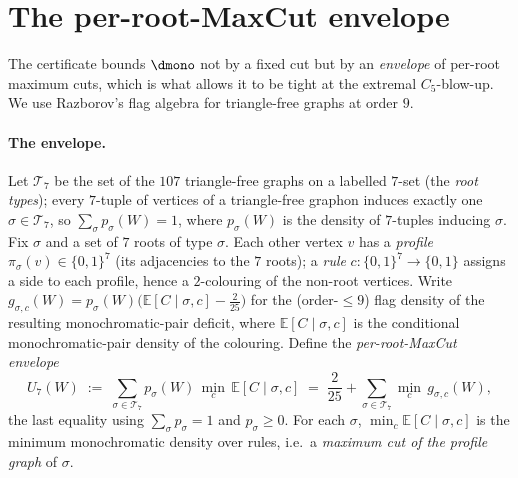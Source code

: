 
\section{The per-root-MaxCut envelope}\label{sec:cert}

The certificate bounds $\dmono$ not by a fixed cut but by an \emph{envelope} of
per-root maximum cuts, which is what allows it to be tight at the extremal
$C_5$-blow-up. We use Razborov's flag algebra for triangle-free graphs
\cite{Raz07,BCL21} at order $9$.

\paragraph{The envelope.} Let $\mathcal{T}_7$ be the set of the $107$ triangle-free
graphs on a labelled $7$-set (the \emph{root types}); every $7$-tuple of vertices
of a triangle-free graphon induces exactly one $\sigma\in\mathcal{T}_7$, so
$\sum_{\sigma}p_\sigma(W)=1$, where $p_\sigma(W)$ is the density of $7$-tuples
inducing $\sigma$. Fix $\sigma$ and a set of $7$ roots of type $\sigma$. Each other
vertex $v$ has a \emph{profile} $\pi_\sigma(v)\in\{0,1\}^7$ (its adjacencies to the
$7$ roots); a \emph{rule} $c\colon\{0,1\}^7\to\{0,1\}$ assigns a side to each
profile, hence a $2$-colouring of the non-root vertices. Write
$g_{\sigma,c}(W)=p_\sigma(W)\bigl(\mathbb{E}[C\mid\sigma,c]-\tfrac{2}{25}\bigr)$ for
the (order-$\le 9$) flag density of the resulting monochromatic-pair deficit, where
$\mathbb{E}[C\mid\sigma,c]$ is the conditional monochromatic-pair density of the
colouring. Define the \emph{per-root-MaxCut envelope}
\[
  U_7(W)\;:=\;\sum_{\sigma\in\mathcal{T}_7}p_\sigma(W)\,\min_c\,\mathbb{E}[C\mid\sigma,c]
        \;=\;\frac{2}{25}+\sum_{\sigma\in\mathcal{T}_7}\min_c\,g_{\sigma,c}(W),
\]
the last equality using $\sum_\sigma p_\sigma=1$ and $p_\sigma\ge 0$. For each
$\sigma$, $\min_c\mathbb{E}[C\mid\sigma,c]$ is the minimum monochromatic density
over rules, i.e.\ a \emph{maximum cut of the profile graph} of $\sigma$.

